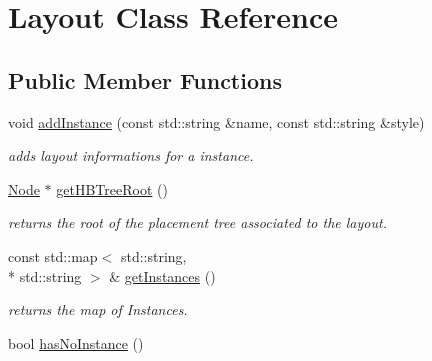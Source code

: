 \hypertarget{class_open_chams_1_1_layout}{\section{Layout Class Reference}
\label{class_open_chams_1_1_layout}
}
\subsection*{Public Member Functions}
\begin{DoxyCompactItemize}
\item 
void \hyperlink{class_open_chams_1_1_layout_a4cc1899e9b782de44700fa0e4ac477ef}{add\-Instance} (const std\-::string \&name, const std\-::string \&style)
\begin{DoxyCompactList}\small\item\em adds layout informations for a instance. \end{DoxyCompactList}\item 
\hypertarget{class_open_chams_1_1_layout_a13df4992219ef28a7dc014e9f5f0566a}{\hyperlink{class_open_chams_1_1_node}{Node} $\ast$ \hyperlink{class_open_chams_1_1_layout_a13df4992219ef28a7dc014e9f5f0566a}{get\-H\-B\-Tree\-Root} ()}\label{class_open_chams_1_1_layout_a13df4992219ef28a7dc014e9f5f0566a}

\begin{DoxyCompactList}\small\item\em returns the root of the placement tree associated to the layout. \end{DoxyCompactList}\item 
\hypertarget{class_open_chams_1_1_layout_ab0550a9050b7e788b2a18452c9df21f7}{const std\-::map$<$ std\-::string, \\*
std\-::string $>$ \& \hyperlink{class_open_chams_1_1_layout_ab0550a9050b7e788b2a18452c9df21f7}{get\-Instances} ()}\label{class_open_chams_1_1_layout_ab0550a9050b7e788b2a18452c9df21f7}

\begin{DoxyCompactList}\small\item\em returns the map of Instances. \end{DoxyCompactList}\item 
\hypertarget{class_open_chams_1_1_layout_af27a31f10fcf22daa64f35c9c6bd2cda}{bool \hyperlink{class_open_chams_1_1_layout_af27a31f10fcf22daa64f35c9c6bd2cda}{has\-No\-Instance} ()}\label{class_open_chams_1_1_layout_af27a31f10fcf22daa64f35c9c6bd2cda}


\end{DoxyCompactItemize}
